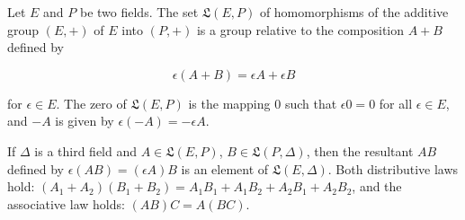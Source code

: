Let $E$ and $P$ be two fields. The set $\mathfrak{L}(E, P)$ of homomorphisms of the additive group $(E, +)$ of $E$ into $(P, +)$ is a group relative to the composition $A + B$ defined by

$$\epsilon(A + B) = \epsilon A + \epsilon B$$

for $\epsilon \in E$. The zero of $\mathfrak{L}(E, P)$ is the mapping $0$ such that $\epsilon 0 = 0$ for all $\epsilon \in E$, and $-A$ is given by $\epsilon(-A) = -\epsilon A$.

If $\Delta$ is a third field and $A \in \mathfrak{L}(E, P)$, $B \in \mathfrak{L}(P, \Delta)$, then the resultant $AB$ defined by $\epsilon(AB) = (\epsilon A)B$ is an element of $\mathfrak{L}(E, \Delta)$. Both distributive laws hold: $(A_1 + A_2)(B_1 + B_2) = A_1B_1 + A_1B_2 + A_2B_1 + A_2B_2$, and the associative law holds: $(AB)C = A(BC)$.
